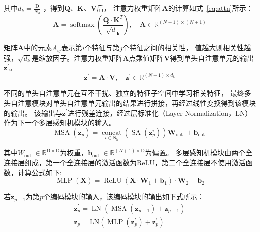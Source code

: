 其中$d_{k}=\frac{\mathrm{D}}{N_{h}}$ ，得到$\boldsymbol{Q}$、$\boldsymbol{K}$、$\boldsymbol{V}$后，
注意力权重矩阵$\boldsymbol{A}$的计算如式~\ref{eq:attn}所示：
\begin{equation}
  \boldsymbol{A}=\operatorname{softmax}\left(\frac{\boldsymbol{Q} \cdot \boldsymbol{K}^{T}}{\sqrt{d}_{\boldsymbol{k}}}\right), \quad \boldsymbol{A} \in \mathbb{R}^{(N+1) \times(N+1)}
  \label{eq:attn}
\end{equation}

矩阵$\boldsymbol{A}$中的元素$A_{ij}$表示第$i$个特征与第$j$个特征之间的相关性，
值越大则相关性越强，$\sqrt{d_k}$是缩放因子。注意力权重矩阵$\boldsymbol{A}$点乘值矩阵$\boldsymbol{V}$得到单头自注意单元的输出$\mathbf{z}^{\prime}$。
\begin{equation}
  \mathbf{z}^{\prime}=\boldsymbol{A} \cdot \boldsymbol{V}, \quad \mathbf{z}^{\prime} \in \mathbb{R}^{(N+1) \times d_{k}}
  \label{eq:attn_out}
\end{equation}

不同的单头自注意单元在互不干扰、独立的特征子空间中学习相关特征，
最终多头自注意模块对单头自注意单元输出的结果进行拼接，再经过线性变换得到该模块的输出。
该输出与$\mathbf{z}^{\prime}$进行残差连接，经过层标准化（Layer Normalization，LN）作为下一个多层感知机模块的输入。
\begin{equation}
  \operatorname{MSA}\left(\mathbf{z}_{p}\right)=\underset{i \in \mathrm{N}_{\mathrm{h}}}{\operatorname{concat}}\left(\operatorname{SA}\left(\mathbf{z}_{p}^{i}\right)\right) \boldsymbol{W}_{\text {out }}+\boldsymbol{b}_{\text {out }}
  \label{eq:multi_out}
\end{equation}

其中$W_{\text {out }} \in \mathbb{R}^{\mathrm{D} \times \mathrm{D}}$为权重，$\boldsymbol{b}_{\text {out }} \in \mathbb{R}^{(N+1) \times \mathrm{D}}$为偏置。
多层感知机模块由两个全连接层组成，第一个全连接层的激活函数为ReLU，第二个全连接层不使用激活函数，计算公式如下:
\begin{equation}
  \operatorname{MLP}(\boldsymbol{X})=\operatorname{ReLU}\left(\boldsymbol{X} \cdot \boldsymbol{W}_{1}+\boldsymbol{b}_{1}\right) \cdot \boldsymbol{W}_{2}+\boldsymbol{b}_{2}
  \label{eq:msa_out}
\end{equation}

若$\mathbf{z}_{p-1}$为第$p$个编码模块的输入，该编码模块的输出如下式所示：
\begin{equation}
  \begin{array}{l}
  \mathbf{z}_{p}^{\prime}=\operatorname{LN}\left(\operatorname{MSA}\left(\mathbf{z}_{p-1}\right)+\mathbf{z}_{p-1}\right) \\
  \mathbf{z}_{p}=\mathrm{LN}\left(\operatorname{MLP}\left(\mathbf{z}_{p}^{\prime}\right)+\mathbf{z}_{p}^{\prime}\right)
  \end{array}
  \label{eq:encoder_out}
\end{equation}

